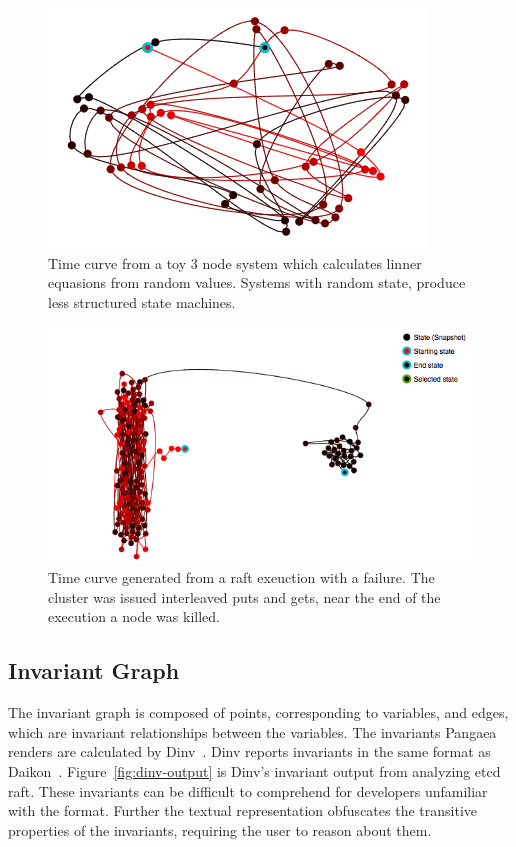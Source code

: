 \begin{figure}[h]
    \includegraphics[width=\linewidth]{fig/linear-server}%
    \caption{Time curve from a toy 3 node system which calculates linner equasions from random values. Systems with random state, produce less structured state machines. \label{fig:linear-server}}%
\end{figure}

\begin{figure}[h]
    \includegraphics[width=\linewidth]{fig/put-get-fail}%
    \caption{Time curve generated from a raft exeuction with a failure. The cluster was issued interleaved puts and gets, near the end of the execution a node was killed.\label{fig:put-get-fail}}%
\end{figure}

\subsection{Invariant Graph}
\label{sec:invariant-graph}

The invariant graph is composed of points, corresponding to variables,
and edges, which are invariant relationships between the variables.
The invariants Pangaea renders are calculated by Dinv~\cite{dinv}.
Dinv reports invariants in the same format as Daikon~\cite{Ernst01}.
Figure~\ref{fig:dinv-output} is Dinv's invariant output from analyzing
etcd raft. These invariants can be difficult to comprehend for
developers unfamiliar with the format. Further the textual representation
obfuscates the transitive properties of the invariants, requiring the
user to reason about them.

